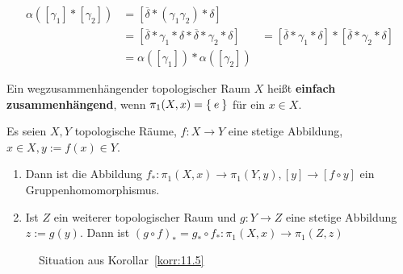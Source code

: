 \begin{beweis}
    \begin{align*}
        \alpha([\gamma_1] * [\gamma_2]) &= [\overline{\delta} * (\gamma_1 \gamma_2) * \delta]\\
        &= [\overline{\delta} * \gamma_1 * \delta * \overline{\delta} * \gamma_2 * \delta]
        &= [\overline{\delta} * \gamma_1 * \delta] * [\overline{\delta} * \gamma_2 * \delta]\\
        &= \alpha([\gamma_1]) * \alpha([\gamma_2])
    \end{align*}
\end{beweis}

\begin{definition}%
    Ein wegzusammenhängender topologischer Raum $X$ heißt
    \textbf{einfach zusammenhängend}, wenn $\pi_1(X,x) = \Set{e}$
    für ein  $x \in X$.
\end{definition}

\begin{korollar}\label{korr:11.5}
    Es seien $X, Y$ topologische Räume, $f:X \rightarrow Y$ eine
    stetige Abbildung, $x \in X, y := f(x) \in Y$.

    \begin{enumerate}[label=\alph*)]
        \item Dann ist die Abbildung $f_* : \pi_1(X,x) \rightarrow \pi_1(Y, y),
        [y] \rightarrow [f \circ y]$ ein Gruppenhomomorphismus.
        \item Ist $Z$ ein weiterer topologischer Raum und $g: Y \rightarrow Z$
              eine stetige Abbildung $z:= g(y)$. Dann ist
              $(g \circ f)_* = g_* \circ f_*: \pi_1(X,x) \rightarrow \pi_1(Z,z)$
    \end{enumerate}
\end{korollar}

\begin{figure}
    \centering
    
    \caption{Situation aus Korollar~\ref{korr:11.5}}
    \label{fig:kor-bem-11.5}
\end{figure}

